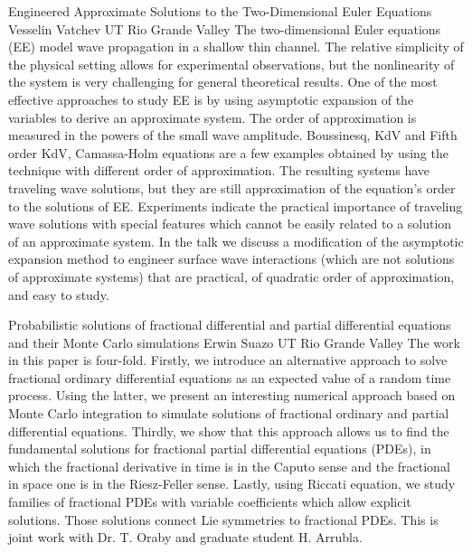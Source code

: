\begin{addmargin}[2em]{0em}
\vspace{1.5ex}
\abs
{Engineered Approximate Solutions to the Two-Dimensional Euler Equations}
{Vesselin Vatchev}
{UT Rio Grande Valley}
{The two-dimensional Euler equations (EE) model wave propagation in a shallow thin channel. The relative simplicity of the physical setting allows for experimental observations, but the nonlinearity of the system is very challenging for general theoretical results. One of the most effective approaches to study EE is by using asymptotic expansion of the variables to derive an approximate system. The order of approximation is measured in the powers of the small wave amplitude. Boussinesq, KdV and Fifth order KdV, Camassa-Holm equations are a few examples obtained by using the technique with different order of approximation. The resulting systems have traveling wave solutions, but they are still approximation of the equation’s order to the solutions of EE. Experiments indicate the practical importance of traveling wave solutions with special features which cannot be easily related to a solution of an approximate system. In the talk we discuss a modification of the asymptotic expansion method to engineer surface wave interactions (which are not solutions of approximate systems)  that are practical, of quadratic order of approximation, and easy to study.}


\vspace{1.5ex}
\abs
{Probabilistic solutions of fractional differential and partial differential equations and their Monte Carlo simulations}
{Erwin Suazo}
{UT Rio Grande Valley}
{The work in this paper is four-fold. Firstly, we introduce an alternative approach to solve fractional ordinary differential equations as an expected value of a random time process. Using the latter, we present an interesting numerical approach based on Monte Carlo integration to simulate solutions of fractional ordinary and partial differential equations. Thirdly, we show that this approach allows us to find the fundamental solutions for fractional partial differential equations (PDEs), in which the fractional derivative in time is in the Caputo sense and the fractional in space one is in the Riesz-Feller sense. Lastly, using Riccati equation, we study families of fractional PDEs with variable coefficients which allow explicit solutions. Those solutions connect Lie symmetries to fractional PDEs. This is joint work with Dr. T. Oraby and graduate student H. Arrubla.}



\end{addmargin}
